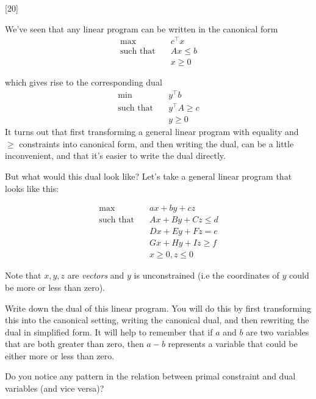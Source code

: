 \documentclass[addpoints]{exam}
\begin{document}
\begin{questions}
\begin{parts}
\end{parts}


[20]

We've seen that any linear program can be written in the canonical form 
\begin{align*}
  \max \qquad & c^\top x \\
  \text{such that} \quad & Ax \le b \\
  & x \ge 0
\end{align*}

which gives rise to the corresponding dual
\begin{align*}
  \min \qquad & y^\top b \\
  \text{such that} \quad & y^\top A \ge c \\
  & y \ge 0
\end{align*}
It turns out that first transforming a general linear program with equality and
$\ge$ constraints into canonical form, and then writing the dual, can be a
little inconvenient, and that it's easier to write the dual directly. 

But what would this dual look like? Let's take a general linear program that
looks like this: 

\begin{align*}
\max \qquad & ax + by + cz \\
\text{such that} \quad & Ax + By + Cz \le d \\
& Dx + Ey + Fz = e \\
& Gx + Hy + Iz \ge f \\
& x \ge 0, z \le 0
\end{align*}

Note that $x, y, z$ are \emph{vectors} and $y$ is unconstrained (i.e the
coordinates of $y$ could be more or less than zero). 

Write down the dual of this linear program. You will do this by first
transforming this into the canonical setting, writing the canonical dual, and
then rewriting the dual in simplified form. It will help to remember that if $a$
and $b$ are two variables that are both greater than zero, then $a-b$ represents
a variable that could be either more or less than zero. 

Do you notice any pattern in the relation between primal constraint and dual
variables (and vice versa)? 


\end{questions}
\end{document}
